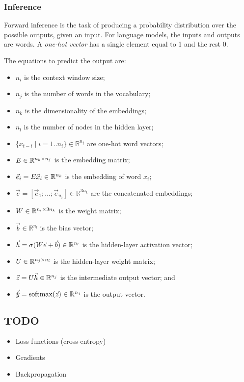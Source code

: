 \subsubsection{Inference}

Forward inference is the task of producing a probability distribution over the
possible outputs, given an input.
For language models, the inputs and outputs are words.
A \textit{one-hot vector} has a single element equal to 1 and the rest 0.

The equations to predict the output are:
\begin{itemize}
  \item $n_i$ is the context window size;
  \item $n_j$ is the number of words in the vocabulary;
  \item $n_k$ is the dimensionality of the embeddings;
  \item $n_l$ is the number of nodes in the hidden layer;
  \item $\{ x_{t - i} \mid i = 1 .. n_i \} \in \mathbb{R}^{n_j}$ are one-hot word vectors;
  \item $E \in \mathbb{R}^{n_k \times n_j}$ is the embedding matrix;
  \item $\vec{e}_i = E \vec{x}_i \in \mathbb{R}^{n_k}$ is the embedding
        of word $x_i$;
  \item $\vec{e} = [\vec{e}_1; \ldots; \vec{e}_{n_i}] \in \mathbb{R}^{3 n_k}$
        are the concatenated embeddings;
  \item $W \in \mathbb{R}^{n_l \times 3 n_k}$ is the weight matrix;
  \item $\vec{b} \in \mathbb{R}^{n_l}$ is the bias vector;
  \item $\vec{h} = \sigma(W \vec{e} + \vec{b}) \in \mathbb{R}^{n_l}$ is
        the hidden-layer activation vector;
  \item $U \in \mathbb{R}^{n_j \times n_l}$ is the hidden-layer weight matrix;
  \item $\vec{z} = U \vec{h} \in \mathbb{R}^{n_j}$ is the intermediate
        output vector; and
  \item $\vec{\hat{y}} = \operatorname{softmax}(\vec{z}) \in \mathbb{R}^{n_j}$ is the output
        vector.
\end{itemize}

\subsection{TODO}

\begin{itemize}
  \item Loss functions (cross-entropy)
  \item Gradients
  \item Backpropagation
\end{itemize}